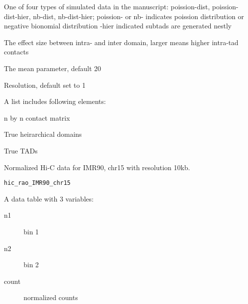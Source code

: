 \documentclass[a4paper]{book}
\begin{document}
\begin{Arguments}
\begin{ldescription}
\item[\code{stype}] One of four types of simulated data in the manuscript:
poission-dist, poission-dist-hier, nb-dist, nb-dist-hier;
poission- or nb- indicates poission distribution or negative bionomial distribution
-hier indicated subtads are generated nestly

\item[\code{nratio}] The effect size between intra- and inter domain, larger means higher intra-tad contacts

\item[\code{mu0}] The mean parameter, default 20

\item[\code{resl}] Resolution, default set to 1
\end{ldescription}
\end{Arguments}
%
\begin{Value}
A list includes following elements:
\begin{ldescription}
\item[\code{hic\_mat}] n by n contact matrix
\item[\code{hierTads}] True heirarchical domains
\item[\code{tads\_true}] True TADs
\end{ldescription}
\end{Value}
%
\begin{Description}\relax
Normalized Hi-C data for IMR90, chr15 with resolution 10kb.
\end{Description}
%
\begin{Usage}
\begin{verbatim}
hic_rao_IMR90_chr15
\end{verbatim}
\end{Usage}
%
\begin{Format}
A data table with 3 variables:
\begin{description}

\item[n1] bin 1
\item[n2] bin 2
\item[count] normalized counts

\end{description}
\end{Format}
\end{document}
